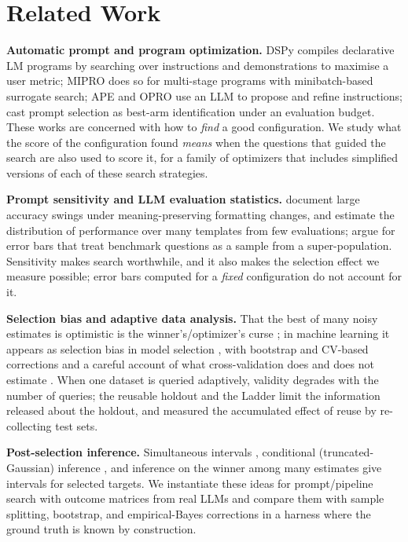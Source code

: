 \section{Related Work}
\label{sec:related}
\textbf{Automatic prompt and program optimization.}
DSPy \citep{khattab2023dspy} compiles declarative LM programs by searching over instructions and demonstrations to maximise a user metric; MIPRO \citep{opsahl2024optimizing} does so for multi-stage programs with minibatch-based surrogate search; APE \citep{zhou2023large} and OPRO \citep{yang2024large} use an LLM to propose and refine instructions; \citet{shi2024efficient} cast prompt selection as best-arm identification under an evaluation budget. These works are concerned with how to \emph{find} a good configuration. We study what the score of the configuration found \emph{means} when the questions that guided the search are also used to score it, for a family of optimizers that includes simplified versions of each of these search strategies.

\textbf{Prompt sensitivity and LLM evaluation statistics.}
\citet{sclar2024quantifying} document large accuracy swings under meaning-preserving formatting changes, and \citet{polo2024efficient} estimate the distribution of performance over many templates from few evaluations; \citet{miller2024adding} argue for error bars that treat benchmark questions as a sample from a super-population. Sensitivity makes search worthwhile, and it also makes the selection effect we measure possible; error bars computed for a \emph{fixed} configuration do not account for it.

\textbf{Selection bias and adaptive data analysis.}
That the best of many noisy estimates is optimistic is the winner's/optimizer's curse \citep{smith2006optimizer}; in machine learning it appears as selection bias in model selection \citep{cawley2010overfitting,varma2006bias}, with bootstrap and CV-based corrections \citep{efron1997improvements,tibshirani2009bias} and a careful account of what cross-validation does and does not estimate \citep{bates2023cross}. When one dataset is queried adaptively, validity degrades with the number of queries; the reusable holdout \citep{dwork2015preserving,dwork2015reusable} and the Ladder \citep{blum2015ladder} limit the information released about the holdout, and \citet{recht2019imagenet} measured the accumulated effect of reuse by re-collecting test sets.

\textbf{Post-selection inference.}
Simultaneous intervals \citep{berk2013valid,chernozhukov2013gaussian}, conditional (truncated-Gaussian) inference \citep{lee2016exact}, and inference on the winner among many estimates \citep{andrews2024inference} give intervals for selected targets. We instantiate these ideas for prompt/pipeline search with outcome matrices from real LLMs and compare them with sample splitting, bootstrap, and empirical-Bayes corrections in a harness where the ground truth is known by construction.
